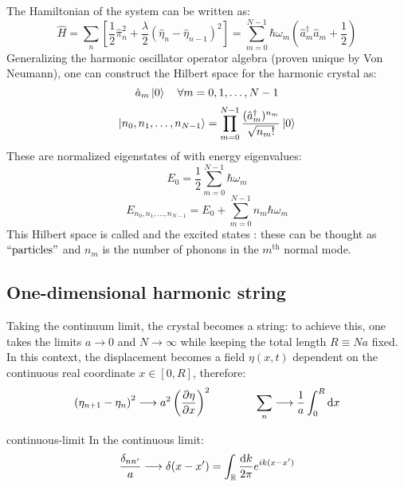 The Hamiltonian of the system can be written as:
\begin{equation}
  \hat{H} = \sum_{n} \left[ \frac{1}{2} \hat{\pi}_n^2 + \frac{\lambda}{2} \left( \hat{\eta}_n - \hat{\eta}_{n-1} \right)^2 \right] = \sum_{m = 0}^{N - 1} \hbar \omega_m \left( \hat{a}_m^\dagger \hat{a}_m + \frac{1}{2} \right)
  \label{eq:first-ham}
\end{equation}
Generalizing the harmonic oscillator operator algebra (proven unique by Von Neumann), one can construct the Hilbert space for the harmonic crystal as:
\begin{equation}
  \hat{a}_m \ket{0} \quad \forall m = 0, 1, \dots, N - 1
\end{equation}
\begin{equation}
  \ket{n_0, n_1, \dots, n_{N-1}} = \prod_{m = 0}^{N - 1} \frac{( \hat{a}_m^\dagger )^{n_m}}{\sqrt{n_m!}} \ket{0}
\end{equation}
These are normalized eigenstates of  with energy eigenvalues:
\begin{equation}
  E_0 = \frac{1}{2} \sum_{m = 0}^{N - 1} \hbar \omega_m
  \label{eq:first-harm}
\end{equation}
\begin{equation}
  E_{n_0, n_1, \dots, n_{N-1}} = E_0 + \sum_{m = 0}^{N - 1} n_m \hbar \omega_m
\end{equation}
This Hilbert space is called  and the excited states : these can be thought as $ ``\text{particles}" $ and $ n_m $ is the number of phonons in the $ m^{\mathrm{th}} $ normal mode.

\subsection{One-dimensional harmonic string}

Taking the continuum limit, the crystal becomes a string: to achieve this, one takes the limits $ a \rightarrow 0 $ and $ N \rightarrow \infty $ while keeping the total length $ R \equiv N a $ fixed. In this context, the displacement becomes a field $ \eta(x,t) $ dependent on the continuous real coordinate $ x \in [0, R] $, therefore:
\begin{equation*}
  \left( \eta_{n + 1} - \eta_n \right)^2 \longrightarrow a^2 \left( \frac{\partial \eta}{\partial x} \right)^2
  \qquad \qquad
  \sum_{n} \longrightarrow \frac{1}{a} \int_0^R \mathrm{d} x
\end{equation*}

\begin{proposition}{}{continuous-limit}
  In the continuous limit:
  \begin{equation*}
    \frac{\delta_{nn'}}{a} \longrightarrow \delta(x - x') = \int_{\mathbb{R}} \frac{\mathrm{d} k}{2\pi} e^{i k (x - x')}
  \end{equation*}
\end{proposition}

